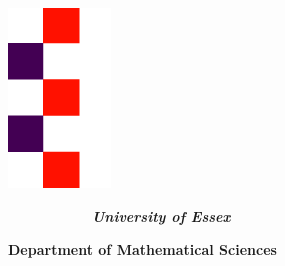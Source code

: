 \documentclass[12pt, a4paper, oneside]{book}
\numberwithin{equation}{section}
\begin{document}
\thispagestyle{empty}

\begin{minipage}{0.2\textwidth}
\centerline{\includegraphics[width=.4\textwidth]{images/title-page/essex} }
\end{minipage}
\begin{minipage}{0.8\textwidth}

$ \qquad \qquad \qquad ${\LARGE \bf \sl University of Essex}

{\LARGE \bf Department of Mathematical Sciences}

\end{minipage}
\end{document}
